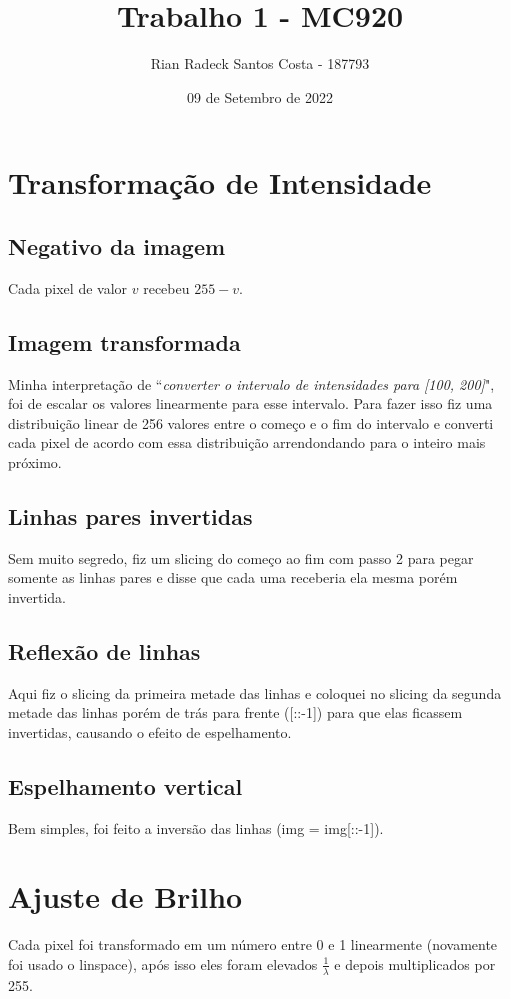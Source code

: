 \documentclass[12pt, letterpaper]{article}
\title{Trabalho 1 - MC920}
\author{Rian Radeck Santos Costa - 187793}
\date{09 de Setembro de 2022}
\begin{document}
\maketitle
\newpage

\section{Transformação de Intensidade}
	\subsection{Negativo da imagem}
		Cada pixel de valor $v$ recebeu $255 - v$.
	\subsection{Imagem transformada}
		Minha interpretação de ``\textit{converter o intervalo de intensidades para [100, 200]}", foi de escalar os valores linearmente para esse intervalo. Para fazer isso fiz uma distribuição linear de 256 valores entre o começo e o fim do intervalo e converti cada pixel de acordo com essa distribuição arrendondando para o inteiro mais próximo.
	\subsection{Linhas pares invertidas}
		Sem muito segredo, fiz um slicing do começo ao fim com passo 2 para pegar somente as linhas pares e disse que cada uma receberia ela mesma porém invertida.
	\subsection{Reflexão de linhas}
		Aqui fiz o slicing da primeira metade das linhas e coloquei no slicing da segunda metade das linhas porém de trás para frente ([::-1]) para que elas ficassem invertidas, causando o efeito de espelhamento.
	\subsection{Espelhamento vertical}
		Bem simples, foi feito a inversão das linhas (img = img[::-1]).

\section{Ajuste de Brilho}
	Cada pixel foi transformado em um número entre 0 e 1 linearmente (novamente foi usado o linspace), após isso eles foram elevados $\frac{1}{\lambda}$ e depois multiplicados por 255.
\end{document}
